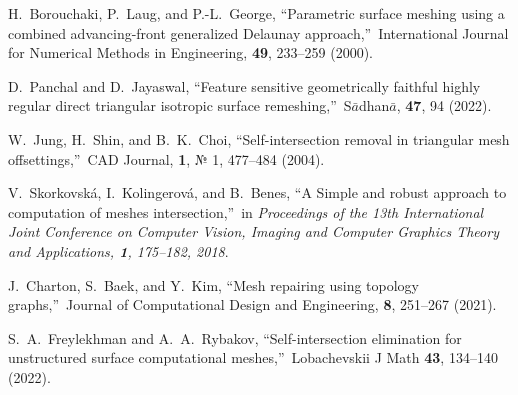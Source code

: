 \documentclass[
11pt,%
tightenlines,%
twoside,%
onecolumn,%
nofloats,%
nobibnotes,%
nofootinbib,%
superscriptaddress,%
noshowpacs,%
centertags]%
{revtex4}
\begin{document}
\begin{thebibliography}{99}
H.~Borouchaki, P.~Laug, and P.-L.~George, \textquotedblleft Parametric surface meshing using a combined advancing-front generalized Delaunay approach,\textquotedblright \ International Journal for Numerical Methods in Engineering, {\bf 49}, 233--259 (2000).

D.~Panchal and D.~Jayaswal, \textquotedblleft Feature sensitive geometrically faithful highly regular direct triangular isotropic surface remeshing,\textquotedblright \ S$\bar{a}$dhan$\bar{a}$, {\bf 47}, 94 (2022).


W.~Jung, H.~Shin, and B.~K.~Choi, \textquotedblleft Self-intersection removal in triangular mesh offsettings,\textquotedblright \ CAD Journal, {\bf 1}, № 1, 477--484 (2004).

V.~Skorkovsk\'a, I.~Kolingerov\'a, and B.~Benes, \textquotedblleft A Simple and robust approach to computation of meshes intersection,\textquotedblright \ in \textit{Proceedings of the 13th International Joint Conference on Computer Vision, Imaging and Computer Graphics Theory and Applications, {\bf 1}, 175--182, 2018}.

J.~Charton, S.~Baek, and Y.~Kim, \textquotedblleft Mesh repairing using topology graphs,\textquotedblright \ Journal of Computational Design and Engineering, {\bf 8}, 251--267 (2021).

S.~A.~Freylekhman and A.~A.~Rybakov, \textquotedblleft Self-intersection elimination for unstructured surface computational meshes,\textquotedblright \ Lobachevskii J Math {\bf 43}, 134--140 (2022).


\end{thebibliography}
\end{document}
